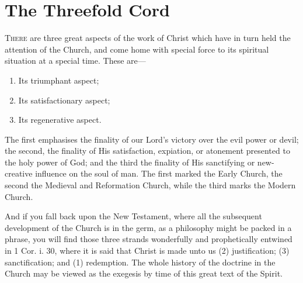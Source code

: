 \documentclass[12pt,a5paper,twoside,titlepage]{book}
\begin{document}
\chapter{The Threefold Cord}


\textsc{There} are three great aspects of the work 
of Christ which have in turn held the 
attention of the Church, and come home with 
special force to its spiritual situation at a special 
time. These are--- 

\begin{enumerate}
\item Its triumphant aspect; 
\item Its satisfactionary aspect; 
\item Its regenerative aspect. 
\end{enumerate}

The first emphasises the finality of our Lord's 
victory over the evil power or devil; the second, 
the finality of His satisfaction, expiation, or 
atonement presented to the holy power of God; 
and the third the finality of His sanctifying or 
new-creative influence on the soul of man. The 
first marked the Early Church, the second the 
Medieval and Reformation Church, while the 
third marks the Modern Church. 

And if you fall back upon the New Testament, 
where all the subsequent development of the 
Church is in the germ, as a philosophy might be 
packed in a phrase, you will find those three 
strands wonderfully and prophetically entwined 
in 1 Cor. i. 30, where it is said that Christ is 
made unto us (2) justification; (3) sanctification; 
and (1) redemption. The whole history of the 
doctrine in the Church may be viewed as the 
exegesis by time of this great text of the Spirit. 
\end{document}
